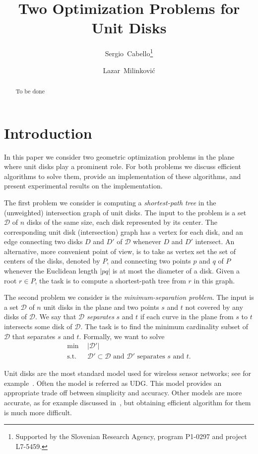 \documentclass[a4paper,USenglish,numberwithinsect]{lipics}
\title{Two Optimization Problems for Unit Disks}
\author[1]{Sergio~Cabello\footnote{Supported by the Slovenian Research Agency, program P1-0297 and project L7-5459.}}
\author[2]{Lazar~Milinkovi\'c}
\affil[1]{FMF, University of Ljubljana, and 
	Institute of Mathematics, Physics and Mechanics, Slovenia}
\affil[2]{FMF and FRI, University of Ljubljana, Slovenia}
\newcommand{\D}{\ensuremath{\mathcal{D}}}
\begin{document}
\maketitle

\begin{abstract}
	To be done
\end{abstract}

\section{Introduction}

In this paper we consider two geometric optimization problems in the plane
where unit disks play a prominent role. For both problems 
we discuss efficient algorithms to solve them, provide an implementation
of these algorithms, and present experimental results on the implementation.

The first problem we consider is computing a \emph{shortest-path tree} 
in the (unweighted) intersection graph of unit disks. 
The input to the problem is a set $\D$ of $n$ disks of the same size, 
each disk represented by its center.
The corresponding unit disk (intersection) graph has a vertex for each disk,
and an edge connecting two disks $D$ and $D'$ of $\D$ whenever $D$ and $D'$ intersect.
An alternative, more convenient point of view, is to take as vertex set the set of
centers of the disks, denoted by $P$, and connecting two points $p$ and $q$ of $P$ 
whenever the Euclidean length $|pq|$ is at most the diameter of a disk. 
Given a root $r\in P$, the task is to compute a shortest-path tree from $r$ in this graph.

The second problem we consider is the \emph{minimum-separation problem}.
The input is a set $\D$ of $n$ unit disks in the plane and two points
$s$ and $t$ not covered by any disks of $\D$.
We say that $\D$ \emph{separates} $s$ and $t$ if each curve in the plane 
from $s$ to $t$ intersects some disk of $\D$.
The task is to find the minimum cardinality subset of $\D$
that separates $s$ and $t$. Formally, we want to solve
\begin{align*}
	\min ~~		& |\D'|\\
	 \mbox{s.t.}~~ & \D'\subset \D \text{ and $\D'$ separates $s$ and $t$}. 
\end{align*}

Unit disks are the most standard model used for wireless sensor networks; 
see for example~\cite{GG11,HS95,zg-wsn-04}. 
Often the model is referred as UDG.
This model provides an appropriate trade off between simplicity and accuracy. 
Other models are more accurate, as for example discussed in~\cite{KWZ03,LP10},
but obtaining efficient algorithm for them is much more difficult.
\end{document}
